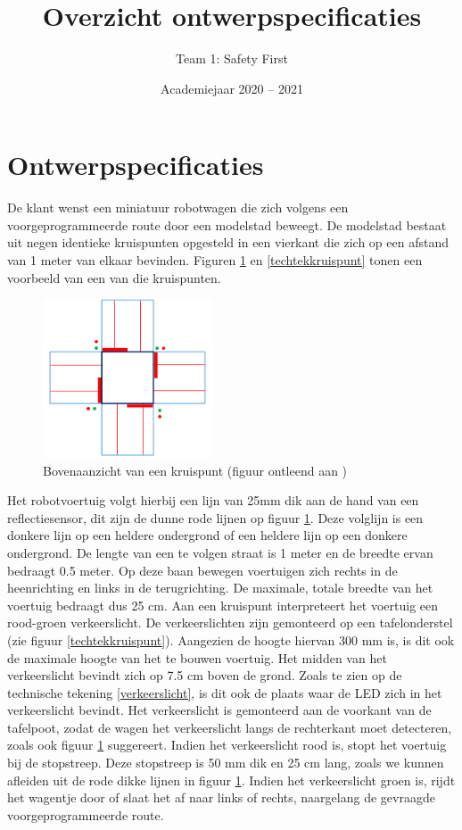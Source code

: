 \documentclass[a4paper,kulak]{kulakarticle} %
\date{Academiejaar 2020 -- 2021}
\title{Overzicht ontwerpspecificaties}
\author{Team 1: Safety First}
\begin{document}
	


\maketitle

\section*{Ontwerpspecificaties}

De klant wenst een miniatuur robotwagen die zich volgens een voorgeprogrammeerde route door een modelstad beweegt. De modelstad bestaat uit negen identieke kruispunten opgesteld in een vierkant die zich op een afstand van 1 meter van elkaar bevinden. Figuren \ref{kruispunt} en \ref{techtekkruispunt} tonen een voorbeeld van een van die kruispunten.

\begin{figure}[h]
	\centering
	\includegraphics[width=0.45\textwidth]{kruispunt.png}
	\caption{Bovenaanzicht van een kruispunt (figuur ontleend aan \cite{teamopdracht})}
	\label{kruispunt}
\end{figure}


Het robotvoertuig volgt hierbij een lijn van 25mm dik aan de hand van een reflectiesensor, dit zijn de dunne rode lijnen op figuur \ref{kruispunt}. Deze volglijn is een donkere lijn op een heldere ondergrond of een heldere lijn op een donkere ondergrond. De lengte van een te volgen straat is 1 meter en de breedte ervan bedraagt 0.5 meter. Op deze baan bewegen voertuigen zich rechts in de heenrichting en links in de terugrichting. De maximale, totale breedte van het voertuig bedraagt dus 25 cm. Aan een kruispunt interpreteert het voertuig een rood-groen verkeerslicht. De verkeerslichten zijn gemonteerd op een tafelonderstel (zie figuur \ref{techtekkruispunt}). Aangezien de hoogte hiervan 300 mm is, is dit ook de maximale hoogte van het te bouwen voertuig. Het midden van het verkeerslicht bevindt zich op 7.5 cm boven de grond. Zoals te zien op de technische tekening \ref{verkeerslicht}, is dit ook de plaats waar de LED zich in het verkeerslicht bevindt. Het verkeerslicht is gemonteerd aan de voorkant van de tafelpoot, zodat de wagen het verkeerslicht langs de rechterkant moet detecteren, zoals ook figuur \ref{kruispunt} suggereert.  Indien het verkeerslicht rood is, stopt het voertuig bij de stopstreep. Deze stopstreep is 50 mm dik en 25 cm lang, zoals we kunnen afleiden uit de rode dikke lijnen in figuur \ref{kruispunt}. Indien het verkeerslicht groen is, rijdt het wagentje door of slaat het af naar links of rechts, naargelang de gevraagde voorgeprogrammeerde route.
\end{document}
